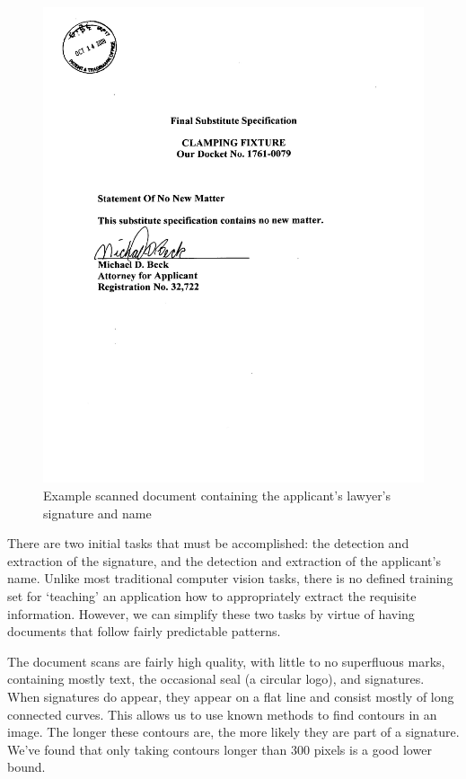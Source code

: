 \documentclass[12pt]{article}
\begin{document}
\begin{figure}
\center
\includegraphics[scale=.5, trim=0 4in 0 3in, clip=true]{figs/signature2}
\caption{Example scanned document containing the applicant's lawyer's signature and name}
\end{figure}

There are two initial tasks that must be accomplished: the detection and extraction of the signature, and the detection and extraction of the applicant's name. Unlike most traditional computer vision tasks, there is no defined training set for `teaching' an application how to appropriately extract the requisite information. However, we can simplify these two tasks by virtue of having documents that follow fairly predictable patterns.

The document scans are fairly high quality, with little to no superfluous marks, containing mostly text, the occasional seal (a circular logo), and signatures. When signatures do appear, they appear on a flat line and consist mostly of long connected curves. This allows us to use known methods to find contours in an image. The longer these contours are, the more likely they are part of a signature. We've found that only taking contours longer than 300 pixels is a good lower bound.
\end{document}
